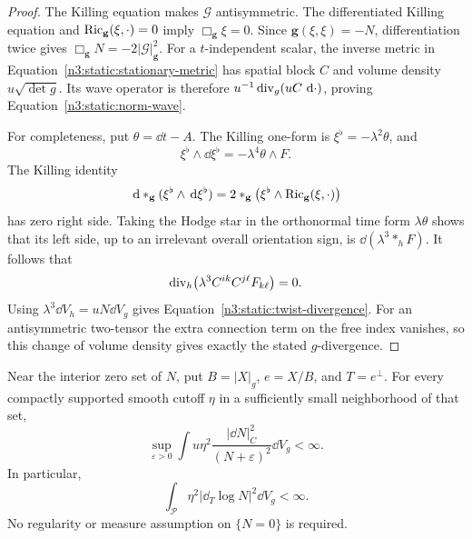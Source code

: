 \begin{proof}
The Killing equation makes \(\mathcal G\) antisymmetric.
The differentiated Killing equation and
\(\operatorname{Ric}_{\mathbf g}(\xi,\cdot)=0\) imply
\(\Box_{\mathbf g}\xi=0\).
Since \(\mathbf g(\xi,\xi)=-N\), differentiation twice gives
\(\Box_{\mathbf g}N=-2|\mathcal G|_{\mathbf g}^2\).
For a \(t\)-independent scalar, the inverse metric in
Equation~\eqref{n3:static:stationary-metric} has spatial block \(C\)
and volume density \(u\sqrt{\det g}\).
Its wave operator is therefore \(u^{-1}\operatorname{div}_g(uC\,\,\mathrm d\cdot)\),
proving Equation~\eqref{n3:static:norm-wave}.

For completeness, put \(\theta=\dd t-A\).
The Killing one-form is \(\xi^\flat=-\lambda^2\theta\), and
\[
\xi^\flat\wedge\dd\xi^\flat=-\lambda^4\theta\wedge F.
\]
The Killing identity
\[
\,\mathrm d *_\mathbf g(\xi^\flat\wedge\,\mathrm d\xi^\flat)
=2*_\mathbf g\bigl(\xi^\flat\wedge\operatorname{Ric}_{\mathbf g}(\xi,\cdot)\bigr)
\]
has zero right side. Taking the Hodge star in the orthonormal time
form \(\lambda\theta\) shows that its left side, up to an irrelevant
overall orientation sign, is \(\dd(\lambda^3 *_hF)\).
It follows that
\[
\operatorname{div}_h\bigl(\lambda^3 C^{ik}C^{j\ell}F_{k\ell}\bigr)=0.
\]
Using \(\lambda^3\dd V_h=uN\dd V_g\) gives
Equation~\eqref{n3:static:twist-divergence}.
For an antisymmetric two-tensor the extra connection term on the free
index vanishes, so this change of volume density gives exactly the
stated \(g\)-divergence.
\end{proof}

\begin{lemma}
\label{n3:static:log-energy}
Near the interior zero set of \(N\), put \(B=|X|_g\),
\(e=X/B\), and \(T=e^\perp\).
For every compactly supported smooth cutoff \(\eta\) in a sufficiently
small neighborhood of that set,
\begin{equation}
\label{n3:static:regularized-energy}
\sup_{\varepsilon>0}
\int u\eta^2
\frac{|\dd N|_C^2}{(N+\varepsilon)^2}\dd V_g<\infty.
\end{equation}
In particular,
\begin{equation}
\label{n3:static:transverse-log}
\int_{\mathcal P}\eta^2|\dd_T\log N|^2\dd V_g<\infty.
\end{equation}
No regularity or measure assumption on \(\{N=0\}\) is required.
\end{lemma}

